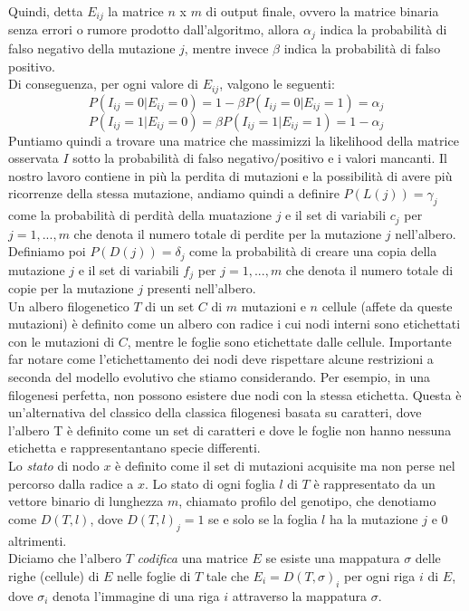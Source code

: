 \documentclass{report}
\begin{document}
  Quindi, detta $E_{ij}$ la matrice $n$ x $m$ di output finale, ovvero la matrice binaria senza errori o rumore prodotto dall'algoritmo, allora ${\alpha}_{j}$ indica la probabilità di falso negativo della mutazione $j$, mentre invece $\beta$ indica la probabilità di falso positivo.\\
  Di conseguenza, per ogni valore di ${E}_{ij}$, valgono le seguenti:
  \[
    P(I_{ij} = 0|{E}_{ij} = 0) = 1 - \beta P(I_{ij} = 0|E_{ij} = 1) = \alpha_{j}
  \]
  \[
    P(I_{ij} = 1|E_{ij} = 0) = \beta P(I_{ij} = 1|E_{ij} = 1) = 1 - \alpha_{j}
  \]
  Puntiamo quindi a trovare una matrice che massimizzi la likelihood della matrice osservata $I$ sotto la probabilità di falso negativo/positivo e i valori mancanti.
  Il nostro lavoro contiene in più la perdita di mutazioni e la possibilità di avere più ricorrenze della stessa mutazione, andiamo quindi a definire $P(L(j))={\gamma}_{j}$ come la probabilità di perdità della muatazione $j$ e il set di variabili ${c}_{j}$ per $j=1,...,m$ che denota il numero totale di perdite per la mutazione $j$ nell'albero.
  Definiamo poi $P(D(j))={\delta}_{j}$ come la probabilità di creare una copia della mutazione $j$ e il set di variabili ${f}_{j}$ per $j=1,...,m$ che denota il numero totale di copie per la mutazione $j$ presenti nell'albero.\\
  Un albero filogenetico $T$ di un set $C$ di $m$ mutazioni e $n$ cellule (affete da queste mutazioni) è definito come un albero con radice i cui nodi interni sono etichettati con le mutazioni di $C$, mentre le foglie sono etichettate dalle cellule. Importante far notare come l'etichettamento dei nodi deve rispettare alcune restrizioni a seconda del modello evolutivo che stiamo considerando. Per esempio, in una filogenesi perfetta, non possono esistere due nodi con la stessa etichetta.
  Questa è un'alternativa del classico della classica filogenesi basata su caratteri, dove l'albero T è definito come un set di caratteri e dove le foglie non hanno nessuna etichetta e rappresentantano specie differenti.\\
  Lo \emph{stato} di nodo $x$ è definito come il set di mutazioni acquisite ma non perse nel percorso dalla radice a $x$. Lo stato di ogni foglia $l$ di $T$ è rappresentato da un vettore binario di lunghezza $m$, chiamato profilo del genotipo, che denotiamo come $D(T, l)$, dove $D{(T, l)}_{j}=1$ se e solo se la foglia $l$ ha la mutazione $j$ e 0 altrimenti.\\
  Diciamo che l'albero $T$ \emph{codifica} una matrice $E$ se esiste una mappatura $\sigma$ delle righe (cellule) di $E$ nelle foglie di $T$ tale che $E_{i}=D(T, \sigma)_{i}$ per ogni riga $i$ di $E$, dove ${\sigma}_{i}$ denota l'immagine di una riga $i$ attraverso la mappatura $\sigma$.
\end{document}
